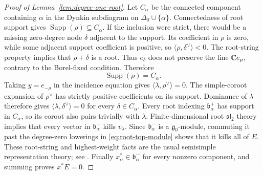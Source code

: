 \begin{proof}[Proof of Lemma~\ref{lem:degree-one-root}]
Let $C_\alpha$ be the connected component containing
$\alpha$ in the Dynkin subdiagram on
$\Delta_0\cup\{\alpha\}$.  Connectedness of root support
gives $\operatorname{Supp}(\rho)\subseteq C_\alpha$.
If the inclusion were strict, there would be a missing
zero-degree node $\delta$ adjacent to the support.
Its coefficient in $\rho$ is zero, while some adjacent
support coefficient is positive, so
$\langle\rho,\delta^\vee\rangle<0$.  The root-string
property implies that $\rho+\delta$ is a root.  Thus
$e_\delta$ does not preserve the line $\mathbb C e_\rho$,
contrary to the Borel-fixed condition.  Therefore
\[
                     \operatorname{Supp}(\rho)=C_\alpha.
\]
Taking $y=e_{-\rho}$ in the incidence equation gives
$\langle\lambda,\rho^\vee\rangle=0$.  The simple-coroot
expansion of $\rho^\vee$ has strictly positive
coefficients on its support.  Dominance of $\lambda$
therefore gives
$\langle\lambda,\delta^\vee\rangle=0$ for every
$\delta\in C_\alpha$.  Every root indexing
$\mathfrak b^+_\alpha$ has support in $C_\alpha$, so
its coroot also pairs trivially with $\lambda$.
Finite-dimensional root $\mathfrak{sl}_2$ theory implies
that every vector in $\mathfrak b^-_\alpha$ kills
$v_\lambda$.  Since $\mathfrak b^-_\alpha$ is a
$\mathfrak g_0$-module, commuting it past the
degree-zero lowerings in \eqref{eq:root-top-module}
shows that it kills all of $E$.  These root-string and
highest-weight facts are the usual semisimple
representation theory; see \cite[\S\S9--10,20--21]{Humphreys}.
Finally $x_\alpha^*\in\mathfrak b^-_\alpha$ for every
nonzero component, and summing proves $x^*E=0$.
\end{proof}
